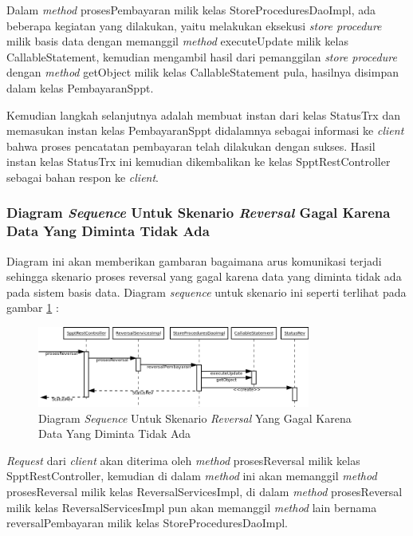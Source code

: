 \documentclass[pdftex,12pt, oneside]{article}
\begin{document}
Dalam \textit{method} prosesPembayaran milik kelas StoreProceduresDaoImpl, ada beberapa kegiatan yang dilakukan, yaitu melakukan eksekusi \textit{store procedure} milik basis data dengan memanggil \textit{method} executeUpdate milik kelas CallableStatement, kemudian mengambil hasil dari pemanggilan \textit{store procedure} dengan \textit{method} getObject milik kelas CallableStatement pula, hasilnya disimpan dalam kelas PembayaranSppt.

Kemudian langkah selanjutnya adalah membuat instan dari kelas StatusTrx dan memasukan instan kelas PembayaranSppt didalamnya sebagai informasi ke \textit{client} bahwa proses pencatatan pembayaran telah dilakukan dengan sukses. Hasil instan kelas StatusTrx ini kemudian dikembalikan ke kelas SpptRestController sebagai bahan respon ke \textit{client}.

\subsubsection{Diagram \textit{Sequence} Untuk Skenario \textit{Reversal} Gagal Karena Data Yang Diminta Tidak Ada}

Diagram ini akan memberikan gambaran bagaimana arus komunikasi terjadi sehingga skenario proses reversal yang gagal karena data yang diminta tidak ada pada sistem basis data. Diagram \textit{sequence} untuk skenario ini seperti terlihat pada gambar \ref{fig:uml-seq-rev-null} :

\begin{figure}[H]
  \centering
  \includegraphics[width=0.8\textwidth]{./resources/uml/uml-seq-rev-null}
  \caption{Diagram \textit{Sequence} Untuk Skenario \textit{Reversal} Yang Gagal Karena Data Yang Diminta Tidak Ada}
  \label{fig:uml-seq-rev-null}
\end{figure}

\textit{Request} dari \textit{client} akan diterima oleh \textit{method} prosesReversal milik kelas SpptRestController, kemudian di dalam \textit{method} ini akan memanggil \textit{method} prosesReversal milik kelas ReversalServicesImpl, di dalam \textit{method} prosesReversal milik kelas ReversalServicesImpl pun akan memanggil \textit{method} lain bernama reversalPembayaran milik kelas StoreProceduresDaoImpl.
\end{document}
